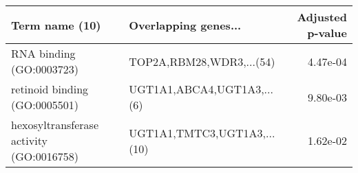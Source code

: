 \begin{tabular}{llr}
\toprule
                          Term name (10) &        Overlapping genes... &  Adjusted p-value \\
\midrule
                RNA binding (GO:0003723) &    TOP2A,RBM28,WDR3,...(54) &          4.47e-04 \\
           retinoid binding (GO:0005501) &  UGT1A1,ABCA4,UGT1A3,...(6) &          9.80e-03 \\
hexosyltransferase activity (GO:0016758) & UGT1A1,TMTC3,UGT1A3,...(10) &          1.62e-02 \\
\bottomrule
\end{tabular}
